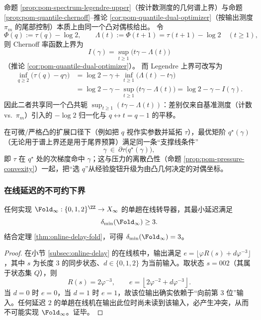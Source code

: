 \begin{remark}\label{rem:pom-legendre-chernoff-same-dual}
命题 \ref{prop:pom-spectrum-legendre-upper}（按计数测度的几何谱上界）与命题 \ref{prop:pom-quantile-chernoff}--推论 \ref{cor:pom-quantile-dual-optimizer}（按输出测度 \(\pi_m\) 的尾部控制）本质上由同一个凸对偶核给出。
令
\[
\Phi(q):=\tau(q)-\log 2,
\qquad
\Lambda(t):=\Phi(t+1)=\tau(t+1)-\log 2\quad(t\ge 1),
\]
则 Chernoff 率函数上界为
\[
I(\gamma)=\sup_{t\ge 1}\bigl(t\gamma-\Lambda(t)\bigr)
\]
（推论 \ref{cor:pom-quantile-dual-optimizer}）。
而 Legendre 上界可改写为
\[
\begin{aligned}
\inf_{q\ge 2}\bigl(\tau(q)-q\gamma\bigr)
&=\log 2-\gamma+\inf_{t\ge 1}\bigl(\Lambda(t)-t\gamma\bigr)\\
&=\log 2-\gamma-\sup_{t\ge 1}\bigl(t\gamma-\Lambda(t)\bigr)
=\log 2-\gamma-I(\gamma).
\end{aligned}
\]
因此二者共享同一个凸共轭 \(\sup_{t\ge 1}(t\gamma-\Lambda(t))\)：差别仅来自基准测度（计数 vs.\ \(\pi_m\)）引入的 \(-\log 2\) 归一化与 \(q\leftrightarrow t=q-1\) 的平移。
\par
在可微/严格凸的扩展口径下（例如把 \(q\) 视作实参数并延拓 \(\tau\)），最优矩阶 \(q^\star(\gamma)\)（无论用于谱上界还是用于尾界预算）满足同一条“支撑线条件”
\[
\gamma\ \in\ \partial \tau\bigl(q^\star(\gamma)\bigr),
\]
即 \(\tau\) 在 \(q^\star\) 处的次梯度命中 \(\gamma\)；这与压力的离散凸性（命题 \ref{prop:pom-pressure-convexity}）一起，把“选 \(q\)”从经验旋钮升级为由凸几何决定的对偶坐标。
\end{remark}

\subsubsection{在线延迟的不可约下界}\label{subsec:pom-delay-lb}

\begin{proposition}\label{prop:pom-delay-min}
任何实现 $\Fold_\infty:\{0,1,2\}^{\ZZ}\to X_\infty$ 的单趟在线转导器，其最小延迟满足
\[
\delta_{\min}(\Fold_\infty)\ge 3.
\]
结合定理 \ref{thm:online-delay-fold}，可得 $\delta_{\min}(\Fold_\infty)=3$。
\end{proposition}
\begin{proof}
在小节 \ref{subsec:online-delay} 的在线核中，输出满足
\(
e=\lfloor \varphi R(s)+d\varphi^{-3}\rfloor
\)，其中 $s$ 为长度 $3$ 的同步状态、$d\in\{0,1,2\}$ 为当前输入。取状态 $s=002$（其属于状态集 $Q$），则
\[
R(s)=2\varphi^{-3},\qquad
e=\left\lfloor 2\varphi^{-2}+d\varphi^{-3}\right\rfloor.
\]
当 $d=0$ 时 $e=0$，当 $d=1$ 时 $e=1$，故该位输出确实依赖于“向前第 $3$ 位”输入。任何延迟 $2$ 的单趟在线机在输出此位时尚未读到该输入，必产生冲突，从而不可能实现 $\Fold_\infty$。证毕。
\end{proof}

